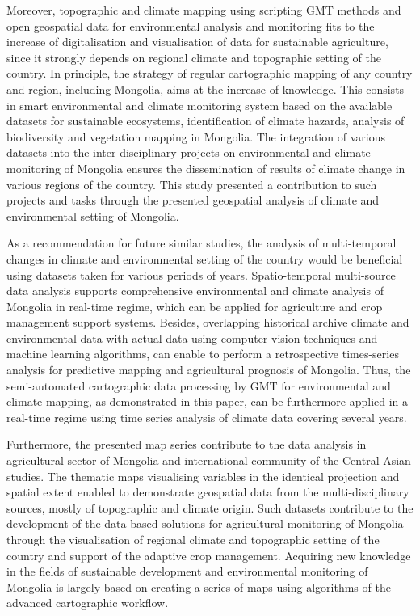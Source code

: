 \documentclass[geosciences,article,submit,pdftex,moreauthors]{Definitions/mdpi}
\begin{document}
Moreover, topographic and climate mapping using scripting GMT methods and open geospatial data for environmental analysis and monitoring fits to the increase of digitalisation and visualisation of data for sustainable agriculture, since it strongly depends on regional climate and topographic setting of the country. In principle, the strategy of regular cartographic mapping of any country and region, including Mongolia, aims at the increase of knowledge. This consists in smart environmental and climate monitoring system based on the available datasets for sustainable ecosystems, identification of climate hazards, analysis of biodiversity and vegetation mapping in Mongolia. The integration of various datasets into the inter-disciplinary projects on environmental and climate monitoring of Mongolia ensures the dissemination of results of climate change in various regions of the country. This study presented a contribution to such projects and tasks through the presented geospatial analysis of climate and environmental setting of Mongolia.

As a recommendation for future similar studies, the analysis of multi-temporal changes in climate and environmental setting of the country would be beneficial using datasets taken for various periods of years. Spatio-temporal multi-source data analysis supports comprehensive environmental and climate analysis of Mongolia in real-time regime, which can be applied for agriculture and crop management support systems. Besides, overlapping historical archive climate and environmental data with actual data using computer vision techniques and machine learning algorithms, can enable to perform a retrospective times-series analysis for predictive mapping and agricultural prognosis of Mongolia. Thus, the semi-automated cartographic data processing by GMT for environmental and climate mapping, as demonstrated in this paper, can be furthermore applied in a real-time regime using time series analysis of climate data covering several years.  

Furthermore, the presented map series contribute to the data analysis in agricultural sector of Mongolia and international community of the Central Asian studies. The thematic maps visualising variables in the identical projection and spatial extent enabled to demonstrate geospatial data from the multi-disciplinary sources, mostly of topographic and climate origin. Such datasets contribute to the development of the data-based solutions for agricultural monitoring of Mongolia through the visualisation of regional climate and topographic setting of the country and support of the adaptive crop management. Acquiring new knowledge in the fields of sustainable development and environmental monitoring of Mongolia is largely based on creating a series of maps using algorithms of the advanced cartographic workflow.
\end{document}
